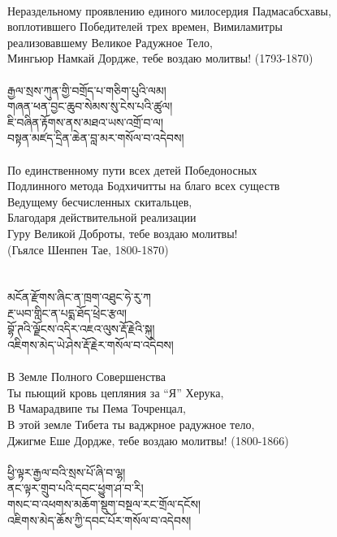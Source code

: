\\
\ru
Нераздельному проявлению единого милосердия Падмасабсхавы,\\
воплотившего Победителей трех времен, Вимиламитры\\
реализовавшему Великое Радужное Тело,\\
Мингьюр Намкай Дордже, тебе воздаю молитвы! (1793-1870)\\
\\
\newpage
\ti
རྒྱལ་སྲས་ཀུན་གྱི་བགྲོད་པ་གཅིག་པུའི་ལམ། \\
གཞན་ཕན་བྱང་ཆུབ་སེམས་སུ་ངེས་པའི་ཚུལ། \\
ཇི་བཞིན་རྟོགས་ནས་མཐའ་ཡས་འགྲོ་བ་ལ། \\
བསྟན་མཛད་དྲིན་ཆེན་བླ་མར་གསོལ་བ་འདེབས།\\
\\
\ru
По единственному пути всех детей Победоносных\\
Подлинного метода Бодхичитты на благо всех существ\\
Ведущему бесчисленных скитальцев,\\
Благодаря действительной реализации \\
Гуру Великой Доброты, тебе воздаю молитвы!\\
\hspace{2cm}(Гьялсе Шенпен Тае, 1800-1870)\\
\\
\\
\ti
མངོན་རྫོགས་ཞིང་ན་ཁྲག་འཐུང་ཧེ་རུ་ཀ \\
རྔ་ཡབ་གླིང་ན་པདྨ་ཐོད་ཕྲེང་རྩལ། \\
བྷོ་ཊའི་ལྗོངས་འདིར་འཇའ་ལུས་རྡོ་རྗེའི་སྐུ། \\
འཇིགས་མེད་ཡེ་ཤེས་རྡོ་རྗེར་གསོལ་བ་འདེབས།\\
\\
\ru
В Земле Полного Совершенства\\
Ты пьющий кровь цепляния за “Я” Херука,\\
В Чамарадвипе ты Пема Точренцал,\\
В этой земле Тибета ты ваджрное радужное тело,\\
Джигме Еше Дордже, тебе воздаю молитвы! (1800-1866)\\
\\
\newpage
\ti
ཕྱི་ལྟར་རྒྱལ་བའི་སྲས་པོ་ཞི་བ་ལྷ། \\
ནང་ལྟར་གྲུབ་པའི་དབང་ཕྱུག་ཤ་བ་རི། \\
གསང་བ་འཕགས་མཆོག་སྡུག་བསྔལ་རང་གྲོལ་དངོས། \\
འཇིགས་མེད་ཆོས་ཀྱི་དབང་པོར་གསོལ་བ་འདེབས།\\
